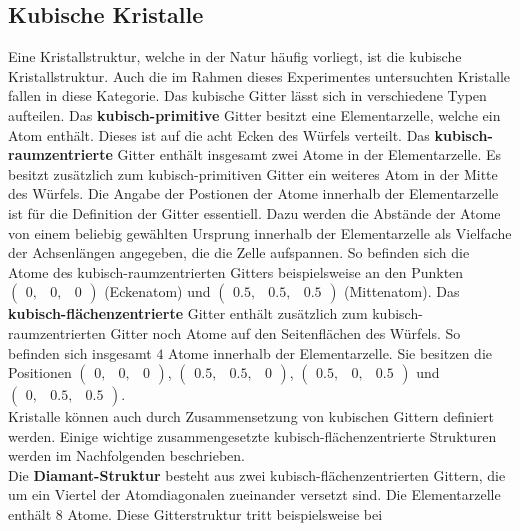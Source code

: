 \subsection{Kubische Kristalle}
%
Eine Kristallstruktur, welche in der Natur häufig vorliegt, ist die kubische Kristallstruktur. Auch die im
Rahmen dieses Experimentes untersuchten Kristalle fallen in diese Kategorie. Das kubische Gitter lässt sich
in verschiedene Typen aufteilen. Das \textbf{kubisch-primitive} Gitter besitzt eine Elementarzelle, welche
ein Atom enthält. Dieses ist auf die acht Ecken des Würfels verteilt. Das \textbf{kubisch-raumzentrierte}
Gitter enthält insgesamt zwei Atome in der Elementarzelle. Es besitzt zusätzlich zum kubisch-primitiven
Gitter ein weiteres Atom in der Mitte des Würfels. Die Angabe der Postionen der Atome innerhalb der
Elementarzelle ist für die Definition der Gitter essentiell. Dazu werden die Abstände der Atome von einem
beliebig gewählten Ursprung innerhalb der Elementarzelle als Vielfache der Achsenlängen angegeben, die die
Zelle aufspannen. So befinden sich die Atome des kubisch-raumzentrierten Gitters beispielsweise an den
Punkten $\begin{pmatrix}0, & 0, & 0 \end{pmatrix}$ (Eckenatom) und $\begin{pmatrix}0.5, & 0.5, & 0.5 \end{pmatrix}$
(Mittenatom). Das \textbf{kubisch-flächenzentrierte} Gitter enthält zusätzlich zum kubisch-raumzentrierten Gitter
noch Atome auf den Seitenflächen des Würfels. So befinden sich insgesamt $4$ Atome innerhalb der Elementarzelle.
Sie besitzen die Positionen $\begin{pmatrix}0, & 0, & 0 \end{pmatrix}$, $\begin{pmatrix}0.5, & 0.5, & 0 \end{pmatrix}$,
$\begin{pmatrix}0.5, & 0, & 0.5 \end{pmatrix}$ und $\begin{pmatrix}0, & 0.5, & 0.5 \end{pmatrix}$.\\
Kristalle können auch durch Zusammensetzung von kubischen Gittern definiert werden. Einige wichtige zusammengesetzte
kubisch-flächenzentrierte Strukturen werden im Nachfolgenden beschrieben.\\
Die \textbf{Diamant-Struktur} besteht aus zwei kubisch-flächenzentrierten Gittern, die um ein Viertel der Atomdiagonalen
zueinander versetzt sind. Die Elementarzelle enthält $8$ Atome. Diese Gitterstruktur tritt beispielsweise bei
